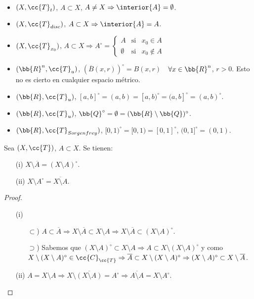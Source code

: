 \begin{ejemplo}\
    \begin{itemize}
        \item $(X, \cc{T}_t)$, $A\subset X$, $A\neq X\Rightarrow \interior{A}=\emptyset$.
        \item $(X, \cc{T}_{disc})$, $A\subset X\Rightarrow \interior{A}=A$.
        \item $(X, \cc{T}_{x_0})$, $A\subset X \Rightarrow A^\circ = \left\{\begin{array}{ccc}
            A & \text{si} & x_0 \in A\\
            \emptyset & \text{si} & x_0 \notin A
        \end{array}\right.$

        \item $(\bb{R}^n, \cc{T}_u)$, $(\overline{B}(x,r))^\circ = B(x,r)$\ \ $\forall x \in \bb{R}^n$, $r>0$. Esto no es cierto en cualquier espacio métrico.
        \item $(\bb{R}, \cc{T}_u)$, $[a,b]^\circ = (a,b) = [a,b)^\circ = (a,b]^\circ = (a,b)^\circ$.
        \item $(\bb{R}, \cc{T}_u)$, $\bb{Q}^\circ = \emptyset = (\bb{R}\setminus \bb{Q})^\circ$.
        \item $(\bb{R}, \cc{T}_{Sorgenfrey})$, $[0,1)^\circ = [0,1) = [0,1]^\circ$, $(0,1]^\circ = (0,1)$.
    \end{itemize}
    \endsquare
\end{ejemplo}

\begin{prop} 
    Sea $(X, \cc{T})$, $A\subset X$. Se tienen:
    \begin{enumerate}
        \item[(i)] $X\setminus \overline{A} = (X\setminus A)^\circ$.
        \item[(ii)] $X\setminus A^\circ = \overline{X\setminus A}$. 
    \end{enumerate}

    \begin{proof}\
        \begin{enumerate}
            \item[(i)] \begin{itemize}
                \item[$\subset$)] $A\subset \overline{A}\Rightarrow X \setminus \overline{A} \subset X \setminus A\Rightarrow X \setminus \overline{A}\subset (X\setminus A)^\circ$.
                \item[$\supset$)]  Sabemos que $(X\setminus A)^\circ \subset X\setminus A \Rightarrow A \subset X \setminus (X\setminus A)^\circ$ y como $X \setminus (X\setminus A)^\circ\in \cc{C}_{\cc{T}}\Rightarrow \overline{A}\subset X\setminus (X\setminus A)^\circ \Rightarrow (X\setminus A)^\circ \subset X\setminus \overline{A}$.
            \end{itemize}
            \item[(ii)] $A=X\setminus A \Rightarrow X \setminus \overline{(X\setminus A)}= A^\circ \Rightarrow \overline{A\setminus A}=X\setminus A^\circ$.
        \end{enumerate}
    \end{proof}
\end{prop}

